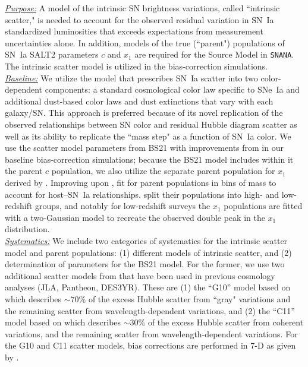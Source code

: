 \documentclass[twocolumn]{aastex63}
\begin{document}
\noindent\uline{\textit{Purpose:}} A model of the intrinsic SN brightness variations, called ``intrinsic scatter," is needed to account for the observed residual variation in SN~Ia standardized luminosities that exceeds expectations from measurement uncertainties alone. In addition, models of the true (``parent") populations of SN~Ia SALT2 parameters $c$ and $x_1$ are required for the Source Model in \texttt{SNANA}. The intrinsic scatter model is utilized in the bias-correction simulations. \\
\uline{\textit{Baseline:}} We utilize the { \citealp[hereafter BS21]{bs20}} model that prescribes SN~Ia scatter into two color-dependent components: a standard cosmological color law specific to SNe~Ia and additional dust-based color laws and dust extinctions that vary with each galaxy/SN. This approach is preferred because of its novel replication of the observed relationships between SN color and residual Hubble diagram scatter as well as its ability to replicate the ``mass step" as a function of SN~Ia color. We use the scatter model parameters from BS21 with improvements from \cite{popovic21b} in our baseline bias-correction simulations; because the BS21 model includes within it the parent $c$ population, we also utilize the separate parent population for $x_1$ derived by \cite{popovic21a}. Improving upon \cite{Scolnic16}, \cite{popovic21a} fit for parent populations in bins of mass to account for host--SN~Ia relationships. \cite{popovic21a} split their populations into high- and low-redshift groups, and notably for low-redshift surveys the $x_1$ populations are fitted with a two-Gaussian model to recreate the observed double peak in the $x_1$ distribution.\\
\uline{\textit{Systematics:}} 
{We include two categories of systematics for the intrinsic scatter model 
and parent populations:  (1) different models of intrinsic scatter, and 
(2) determination of parameters for the BS21 model.}
For the former, we use two additional scatter models {from \cite{Kessler13}} that have been used in previous cosmology analyses (JLA, Pantheon, DES3YR). These are (1) the ``G10'' model based on \cite{Guy10} which describes
$\sim 70$\% of the excess Hubble scatter from ``gray" variations and the remaining scatter from wavelength-dependent variations, and (2) the ``C11'' model based on \cite{Chotard11} which describes $\sim 30$\% of the excess Hubble scatter from coherent variations, and the remaining scatter from wavelength-dependent variations. 
{For the G10 and C11 scatter models, bias corrections are performed in 7-D 
as given by \cite{popovic21a}}.
\end{document}
